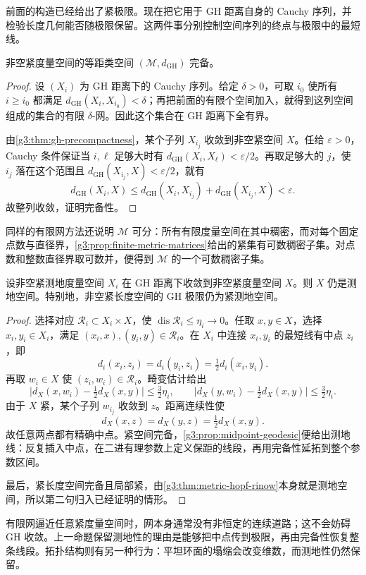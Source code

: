 前面的构造已经给出了紧极限。现在把它用于 GH 距离自身的 Cauchy 序列，并检验长度几何能否随极限保留。这两件事分别控制空间序列的终点与极限中的最短线。

\begin{theorem}\label{g3:thm:gh-complete}
	非空紧度量空间的等距类空间 \((\mathcal M,d_{\mathrm{GH}})\) 完备。
\end{theorem}
\begin{proof}
	设 \((X_i)\) 为 GH 距离下的 Cauchy 序列。给定 \(\delta>0\)，可取 \(i_0\) 使所有 \(i\ge i_0\) 都满足 \(d_{\mathrm{GH}}(X_i,X_{i_0})<\delta\)；再把前面的有限个空间加入，就得到这列空间组成的集合的有限 \(\delta\)-网。因此这个集合在 GH 距离下全有界。

	由\cref{g3:thm:gh-precompactness}，某个子列 \(X_{i_j}\) 收敛到非空紧空间 \(X\)。任给 \(\varepsilon>0\)，Cauchy 条件保证当 \(i,\ell\) 足够大时有 \(d_{\mathrm{GH}}(X_i,X_\ell)<\varepsilon/2\)。再取足够大的 \(j\)，使 \(i_j\) 落在这个范围且 \(d_{\mathrm{GH}}(X_{i_j},X)<\varepsilon/2\)，就有
	\[
		d_{\mathrm{GH}}(X_i,X)
		\le d_{\mathrm{GH}}(X_i,X_{i_j})+d_{\mathrm{GH}}(X_{i_j},X)
		<\varepsilon.
	\]
	故整列收敛，证明完备性。
\end{proof}

同样的有限网方法还说明 \(\mathcal M\) 可分：所有有限度量空间在其中稠密，而对每个固定点数与直径界，\cref{g3:prop:finite-metric-matrices}给出的紧集有可数稠密子集。对点数和整数直径界取可数并，便得到 \(\mathcal M\) 的一个可数稠密子集。

\begin{proposition}\label{g3:prop:gh-geodesic-limit}
	设非空紧测地度量空间 \(X_i\) 在 GH 距离下收敛到非空紧度量空间 \(X\)。则 \(X\) 仍是测地空间。特别地，非空紧长度空间的 GH 极限仍为紧测地空间。
\end{proposition}
\begin{proof}
	选择对应 \(\mathcal R_i\subset X_i\times X\)，使 \(\operatorname{dis}\mathcal R_i\le\eta_i\to0\)。任取 \(x,y\in X\)，选择 \(x_i,y_i\in X_i\)，满足 \((x_i,x),(y_i,y)\in\mathcal R_i\)。在 \(X_i\) 中连接 \(x_i,y_i\) 的最短线有中点 \(z_i\)，即
	\[
		d_i(x_i,z_i)=d_i(y_i,z_i)=\tfrac12d_i(x_i,y_i).
	\]
	再取 \(w_i\in X\) 使 \((z_i,w_i)\in\mathcal R_i\)。畸变估计给出
	\[
		\bigl|d_X(x,w_i)-\tfrac12d_X(x,y)\bigr|\le\tfrac32\eta_i,
		\qquad
		\bigl|d_X(y,w_i)-\tfrac12d_X(x,y)\bigr|\le\tfrac32\eta_i.
	\]
	由于 \(X\) 紧，某个子列 \(w_{i_j}\) 收敛到 \(z\)。距离连续性使
	\[
		d_X(x,z)=d_X(y,z)=\tfrac12d_X(x,y).
	\]
	故任意两点都有精确中点。紧空间完备，\cref{g3:prop:midpoint-geodesic}便给出测地线：反复插入中点，在二进有理参数上定义保距的线段，再用完备性延拓到整个参数区间。

	最后，紧长度空间完备且局部紧，由\cref{g3:thm:metric-hopf-rinow}本身就是测地空间，所以第二句归入已经证明的情形。
\end{proof}

有限网逼近任意紧度量空间时，网本身通常没有非恒定的连续道路；这不会妨碍 GH 收敛。上一命题保留测地性的理由是能够把中点传到极限，再由完备性恢复整条线段。拓扑结构则有另一种行为：平坦环面的塌缩会改变维数，而测地性仍然保留。
